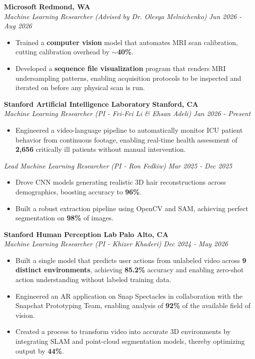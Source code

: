 \documentclass[10pt, letterpaper]{article}
\begin{document}
\smallskip

\textbf{Microsoft} \hfill \textbf{Redmond, WA}\\
\textit{Machine Learning Researcher (Advised by Dr. Olesya Melnichenko)} \hfill \textit{Jun 2026 - Aug 2026}
\begin{itemize}[leftmargin=1.5em, topsep=2pt, itemsep=1pt, parsep=0pt]
  \item Trained a \textbf{computer vision} model that automates MRI scan calibration, cutting calibration overhead by \textbf{$\sim$40\%}.
  \item Developed a \textbf{sequence file visualization} program that renders MRI undersampling patterns, enabling
  acquisition protocols to be inspected and iterated on before any physical scan is run.
\end{itemize}

\smallskip

\textbf{Stanford Artificial Intelligence Laboratory} \hfill \textbf{Stanford, CA}\\
\textit{Machine Learning Researcher (PI - Fei-Fei Li \& Ehsan Adeli)} \hfill \textit{Jan 2026 - Present}
\begin{itemize}[leftmargin=1.5em, topsep=2pt, itemsep=1pt, parsep=0pt]
  \item Engineered a video-language pipeline to automatically monitor ICU patient behavior from continuous footage,
  enabling real-time health assessment of \textbf{2,656} critically ill patients without manual intervention.
\end{itemize}
\textit{Lead Machine Learning Researcher (PI - Ron Fedkiw)} \hfill \textit{Mar 2025 - Dec 2025}
\begin{itemize}[leftmargin=1.5em, topsep=2pt, itemsep=1pt, parsep=0pt]
  \item Drove CNN models generating realistic 3D hair reconstructions across demographics, boosting accuracy to \textbf{96\%}.
  \item Built a robust extraction pipeline using OpenCV and SAM, achieving perfect segmentation on \textbf{98\%} of images.
\end{itemize}

\smallskip

\textbf{Stanford Human Perception Lab} \hfill \textbf{Palo Alto, CA}\\
\textit{Machine Learning Researcher (PI - Khizer Khaderi)} \hfill \textit{Dec 2024 - May 2026}
\begin{itemize}[leftmargin=1.5em, topsep=2pt, itemsep=1pt, parsep=0pt]
  \item Built a single model that predicts user actions from unlabeled video across \textbf{9 distinct environments},
  achieving \textbf{85.2\%} accuracy and enabling zero-shot action understanding without labeled training data.
  \item Engineered an AR application on Snap Spectacles in collaboration with the Snapchat Prototyping Team,
  enabling analysis of \textbf{92\%} of the available field of vision.
  \item Created a process to transform video into accurate 3D environments by integrating SLAM and point-cloud
  segmentation models, thereby optimizing output by \textbf{44\%}.
\end{itemize}
\end{document}
